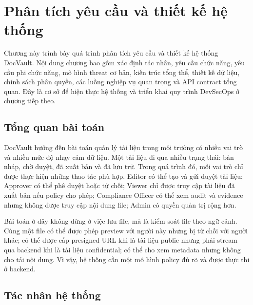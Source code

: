 \chapter{Phân tích yêu cầu và thiết kế hệ thống}

Chương này trình bày quá trình phân tích yêu cầu và thiết kế hệ thống DocVault. Nội dung chương bao gồm xác định tác nhân, yêu cầu chức năng, yêu cầu phi chức năng, mô hình threat cơ bản, kiến trúc tổng thể, thiết kế dữ liệu, chính sách phân quyền, các luồng nghiệp vụ quan trọng và API contract tổng quan. Đây là cơ sở để hiện thực hệ thống và triển khai quy trình DevSecOps ở chương tiếp theo.

\section{Tổng quan bài toán}

DocVault hướng đến bài toán quản lý tài liệu trong môi trường có nhiều vai trò và nhiều mức độ nhạy cảm dữ liệu. Một tài liệu đi qua nhiều trạng thái: bản nháp, chờ duyệt, đã xuất bản và đã lưu trữ. Trong quá trình đó, mỗi vai trò chỉ được thực hiện những thao tác phù hợp. Editor có thể tạo và gửi duyệt tài liệu; Approver có thể phê duyệt hoặc từ chối; Viewer chỉ được truy cập tài liệu đã xuất bản nếu policy cho phép; Compliance Officer có thể xem audit và evidence nhưng không được truy cập nội dung file; Admin có quyền quản trị rộng hơn.

Bài toán ở đây không dừng ở việc lưu file, mà là kiểm soát file theo ngữ cảnh. Cùng một file có thể được phép preview với người này nhưng bị từ chối với người khác; có thể được cấp presigned URL khi là tài liệu public nhưng phải stream qua backend khi là tài liệu confidential; có thể cho xem metadata nhưng không cho tải nội dung. Vì vậy, hệ thống cần một mô hình policy đủ rõ và được thực thi ở backend.

\section{Tác nhân hệ thống}
\label{sec:actors}

